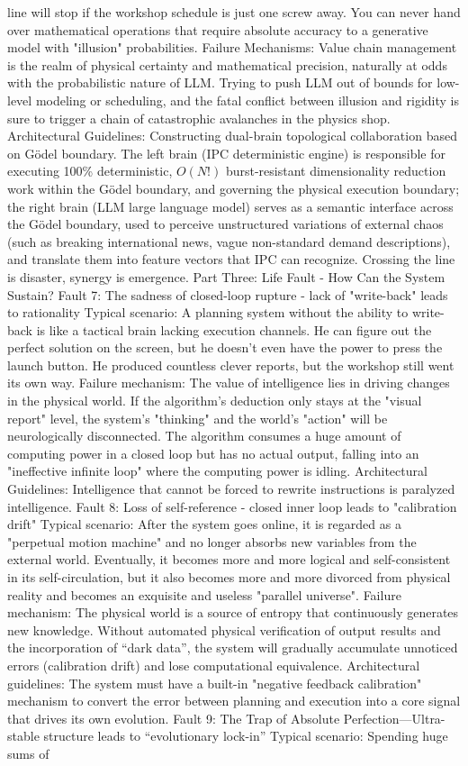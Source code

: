 \documentclass[11pt,a4paper]{article}
\begin{document}
line will stop if the workshop schedule is just one screw away. You can never hand over mathematical operations that require absolute accuracy to a generative model with "illusion" probabilities. Failure Mechanisms: Value chain management is the realm of physical certainty and mathematical precision, naturally at odds with the probabilistic nature of LLM. Trying to push LLM out of bounds for low-level modeling or scheduling, and the fatal conflict between illusion and rigidity is sure to trigger a chain of catastrophic avalanches in the physics shop. Architectural Guidelines: Constructing dual-brain topological collaboration based on Gödel boundary. The left brain (IPC deterministic engine) is responsible for executing 100\% deterministic, $O(N!)$ burst-resistant dimensionality reduction work within the Gödel boundary, and governing the physical execution boundary; the right brain (LLM large language model) serves as a semantic interface across the Gödel boundary, used to perceive unstructured variations of external chaos (such as breaking international news, vague non-standard demand descriptions), and translate them into feature vectors that IPC can recognize. Crossing the line is disaster, synergy is emergence. Part Three: Life Fault - How Can the System Sustain? Fault 7: The sadness of closed-loop rupture - lack of "write-back" leads to rationality Typical scenario: A planning system without the ability to write-back is like a tactical brain lacking execution channels. He can figure out the perfect solution on the screen, but he doesn't even have the power to press the launch button. He produced countless clever reports, but the workshop still went its own way. Failure mechanism: The value of intelligence lies in driving changes in the physical world. If the algorithm's deduction only stays at the "visual report" level, the system's "thinking" and the world's "action" will be neurologically disconnected. The algorithm consumes a huge amount of computing power in a closed loop but has no actual output, falling into an "ineffective infinite loop" where the computing power is idling. Architectural Guidelines: Intelligence that cannot be forced to rewrite instructions is paralyzed intelligence. Fault 8: Loss of self-reference - closed inner loop leads to "calibration drift" Typical scenario: After the system goes online, it is regarded as a "perpetual motion machine" and no longer absorbs new variables from the external world. Eventually, it becomes more and more logical and self-consistent in its self-circulation, but it also becomes more and more divorced from physical reality and becomes an exquisite and useless "parallel universe". Failure mechanism: The physical world is a source of entropy that continuously generates new knowledge. Without automated physical verification of output results and the incorporation of “dark data”, the system will gradually accumulate unnoticed errors (calibration drift) and lose computational equivalence. Architectural guidelines: The system must have a built-in "negative feedback calibration" mechanism to convert the error between planning and execution into a core signal that drives its own evolution. Fault 9: The Trap of Absolute Perfection—Ultra-stable structure leads to “evolutionary lock-in” Typical scenario: Spending huge sums of 
\end{document}
